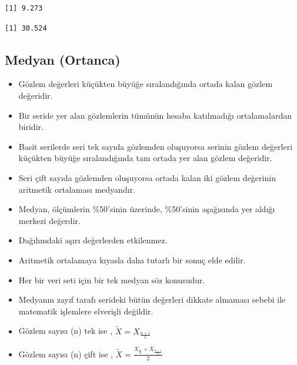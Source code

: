 \documentclass[
  letterpaper,
  DIV=11,
  numbers=noendperiod]{scrreprt}
\newenvironment{Shaded}{\begin{snugshade}}{\end{snugshade}}
\newcommand{\DecValTok}[1]{\textcolor[rgb]{0.68,0.00,0.00}{#1}}
\newcommand{\FunctionTok}[1]{\textcolor[rgb]{0.28,0.35,0.67}{#1}}
\newcommand{\NormalTok}[1]{\textcolor[rgb]{0.00,0.23,0.31}{#1}}
\newcommand{\SpecialCharTok}[1]{\textcolor[rgb]{0.37,0.37,0.37}{#1}}
\begin{document}
\begin{verbatim}
[1] 9.273
\end{verbatim}

\begin{Shaded}
\end{Shaded}

\begin{verbatim}
[1] 30.524
\end{verbatim}

\subsection*{Medyan (Ortanca)}\label{medyan-ortanca}

\begin{itemize}
\item
  Gözlem değerleri küçükten büyüğe sıralandığında ortada kalan gözlem
  değeridir.
\item
  Bir seride yer alan gözlemlerin tümünün hesaba katılmadığı
  ortalamalardan biridir.
\item
  Basit serilerde seri tek sayıda gözlemden oluşuyorsa serinin gözlem
  değerleri küçükten büyüğe sıralandığında tam ortada yer alan gözlem
  değeridir.
\item
  Seri çift sayıda gözlemden oluşuyorsa ortada kalan iki gözlem
  değerinin aritmetik ortalaması medyandır.
\item
  Medyan, ölçümlerin \%50'sinin üzerinde, \%50'sinin aşağısında yer
  aldığı merkezi değerdir.
\item
  Dağılımdaki aşırı değerlerden etkilenmez.
\item
  Aritmetik ortalamaya kıyasla daha tutarlı bir sonuç elde edilir.
\item
  Her bir veri seti için bir tek medyan söz konusudur.
\item
  Medyanın zayıf tarafı serideki bütün değerleri dikkate almaması sebebi
  ile matematik işlemlere elverişli değildir.
\item
  Gözlem sayısı (n) tek ise , \(\widetilde{X} = X_{\frac{n+1}{2}}\)
\item
  Gözlem sayısı (n) çift ise ,
  \(\widetilde{X} = \frac{X_\frac{n}{2}+X_{\frac{n+1}{2}}}{2}\)
\end{itemize}
\end{document}
